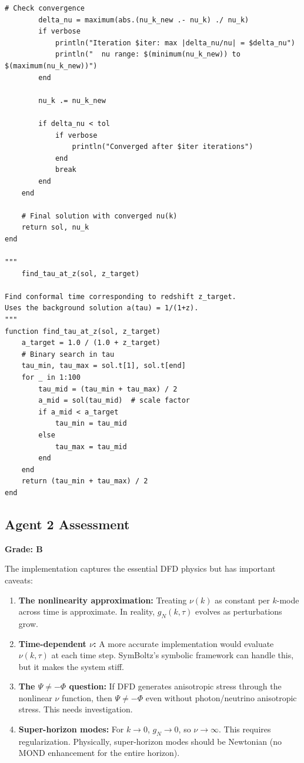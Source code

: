 \documentclass[11pt,a4paper]{article}
\begin{document}
\begin{lstlisting}[caption={Self-consistent iteration for DFD in SymBoltz.jl},label={lst:iterate}]
        # Check convergence
        delta_nu = maximum(abs.(nu_k_new .- nu_k) ./ nu_k)
        if verbose
            println("Iteration $iter: max |delta_nu/nu| = $delta_nu")
            println("  nu range: $(minimum(nu_k_new)) to $(maximum(nu_k_new))")
        end

        nu_k .= nu_k_new

        if delta_nu < tol
            if verbose
                println("Converged after $iter iterations")
            end
            break
        end
    end

    # Final solution with converged nu(k)
    return sol, nu_k
end

"""
    find_tau_at_z(sol, z_target)

Find conformal time corresponding to redshift z_target.
Uses the background solution a(tau) = 1/(1+z).
"""
function find_tau_at_z(sol, z_target)
    a_target = 1.0 / (1.0 + z_target)
    # Binary search in tau
    tau_min, tau_max = sol.t[1], sol.t[end]
    for _ in 1:100
        tau_mid = (tau_min + tau_max) / 2
        a_mid = sol(tau_mid)  # scale factor
        if a_mid < a_target
            tau_min = tau_mid
        else
            tau_max = tau_mid
        end
    end
    return (tau_min + tau_max) / 2
end
\end{lstlisting}

\subsection{Agent 2 Assessment}

\textbf{Grade: B}

The implementation captures the essential DFD physics but has important caveats:

\begin{enumerate}
\item \textbf{The nonlinearity approximation:} Treating $\nu(k)$ as constant per $k$-mode across time is approximate. In reality, $g_N(k,\tau)$ evolves as perturbations grow.
\item \textbf{Time-dependent $\nu$:} A more accurate implementation would evaluate $\nu(k,\tau)$ at each time step. SymBoltz's symbolic framework can handle this, but it makes the system stiff.
\item \textbf{The $\Psi \neq -\Phi$ question:} If DFD generates anisotropic stress through the nonlinear $\nu$ function, then $\Psi \neq -\Phi$ even without photon/neutrino anisotropic stress. This needs investigation.
\item \textbf{Super-horizon modes:} For $k \to 0$, $g_N \to 0$, so $\nu \to \infty$. This requires regularization. Physically, super-horizon modes should be Newtonian (no MOND enhancement for the entire horizon).
\end{enumerate}
\end{document}
